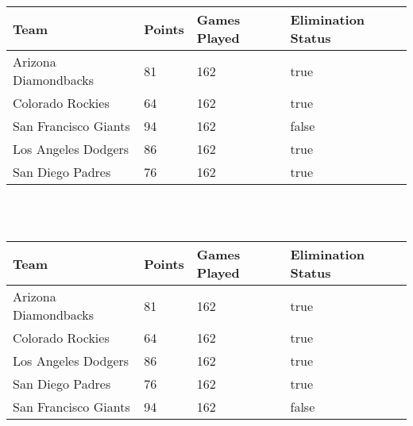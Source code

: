 \documentclass{report}
\begin{document}
\begin{tabular}{| l | l | l | l |}
\hline
Team & Points & Games Played & Elimination Status \\ \hline
Arizona Diamondbacks & 81 & 162 & true\\
Colorado Rockies & 64 & 162 & true\\
San Francisco Giants & 94 & 162 & false\\
Los Angeles Dodgers & 86 & 162 & true\\
San Diego Padres & 76 & 162 & true\\\hline
\end{tabular}\\ \\\begin{tabular}{| l | l | l | l |}
\hline
Team & Points & Games Played & Elimination Status \\ \hline
Arizona Diamondbacks & 81 & 162 & true\\
Colorado Rockies & 64 & 162 & true\\
Los Angeles Dodgers & 86 & 162 & true\\
San Diego Padres & 76 & 162 & true\\
San Francisco Giants & 94 & 162 & false\\\hline
\end{tabular}\\ \\
\end{document}
